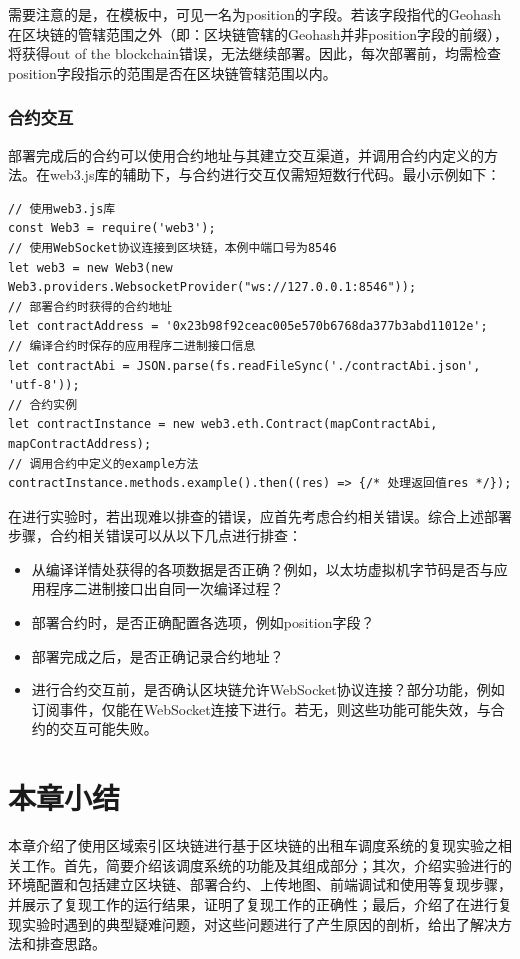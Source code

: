 需要注意的是，在模板中，可见一名为position的字段。若该字段指代的Geohash在区块链的管辖范围之外（即：区块链管辖的Geohash并非position字段的前缀），将获得out of the blockchain错误，无法继续部署。因此，每次部署前，均需检查position字段指示的范围是否在区块链管辖范围以内。

\subsubsection{合约交互}

部署完成后的合约可以使用合约地址与其建立交互渠道，并调用合约内定义的方法。在web3.js库的辅助下，与合约进行交互仅需短短数行代码。最小示例如下：

\begin{lstlisting}[caption={合约交互}, label={lst:合约交互}]
// 使用web3.js库
const Web3 = require('web3');
// 使用WebSocket协议连接到区块链，本例中端口号为8546
let web3 = new Web3(new Web3.providers.WebsocketProvider("ws://127.0.0.1:8546"));
// 部署合约时获得的合约地址
let contractAddress = '0x23b98f92ceac005e570b6768da377b3abd11012e';
// 编译合约时保存的应用程序二进制接口信息
let contractAbi = JSON.parse(fs.readFileSync('./contractAbi.json', 'utf-8'));
// 合约实例
let contractInstance = new web3.eth.Contract(mapContractAbi, mapContractAddress);
// 调用合约中定义的example方法
contractInstance.methods.example().then((res) => {/* 处理返回值res */});
\end{lstlisting}

在进行实验时，若出现难以排查的错误，应首先考虑合约相关错误。综合上述部署步骤，合约相关错误可以从以下几点进行排查：

\begin{itemize}
    \item 从编译详情处获得的各项数据是否正确？例如，以太坊虚拟机字节码是否与应用程序二进制接口出自同一次编译过程？
    \item 部署合约时，是否正确配置各选项，例如position字段？
    \item 部署完成之后，是否正确记录合约地址？
    \item 进行合约交互前，是否确认区块链允许WebSocket协议连接？部分功能，例如订阅事件，仅能在WebSocket连接下进行。若无，则这些功能可能失效，与合约的交互可能失败。
\end{itemize}

\section{本章小结}

本章介绍了使用区域索引区块链进行基于区块链的出租车调度系统的复现实验之相关工作。首先，简要介绍该调度系统的功能及其组成部分；其次，介绍实验进行的环境配置和包括建立区块链、部署合约、上传地图、前端调试和使用等复现步骤，并展示了复现工作的运行结果，证明了复现工作的正确性；最后，介绍了在进行复现实验时遇到的典型疑难问题，对这些问题进行了产生原因的剖析，给出了解决方法和排查思路。
